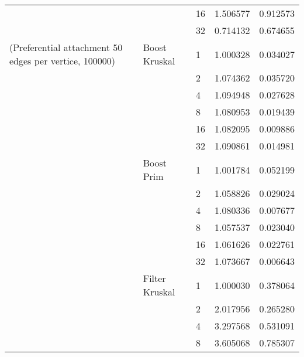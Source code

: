 \begin{tabular}{lllrr}
                                                       &                     & 16 &  1.506577 &  0.912573 \\
                                                       &                     & 32 &  0.714132 &  0.674655 \\
(Preferential attachment 50 edges per vertice, 100000) & Boost Kruskal & 1  &  1.000328 &  0.034027 \\
                                                       &                     & 2  &  1.074362 &  0.035720 \\
                                                       &                     & 4  &  1.094948 &  0.027628 \\
                                                       &                     & 8  &  1.080953 &  0.019439 \\
                                                       &                     & 16 &  1.082095 &  0.009886 \\
                                                       &                     & 32 &  1.090861 &  0.014981 \\
                                                       & Boost Prim & 1  &  1.001784 &  0.052199 \\
                                                       &                     & 2  &  1.058826 &  0.029024 \\
                                                       &                     & 4  &  1.080336 &  0.007677 \\
                                                       &                     & 8  &  1.057537 &  0.023040 \\
                                                       &                     & 16 &  1.061626 &  0.022761 \\
                                                       &                     & 32 &  1.073667 &  0.006643 \\
                                                       & Filter Kruskal & 1  &  1.000030 &  0.378064 \\
                                                       &                     & 2  &  2.017956 &  0.265280 \\
                                                       &                     & 4  &  3.297568 &  0.531091 \\
                                                       &                     & 8  &  3.605068 &  0.785307 \\

\end{tabular}
